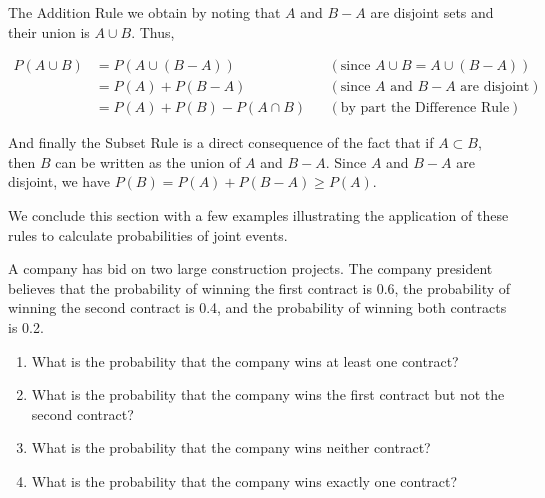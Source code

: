 The Addition Rule we obtain by noting that $A$ and $B-A$ are disjoint sets and their union is $A \cup B$. Thus,

\begin{align*}
    P(A \cup B) &= P(A \cup (B - A)) && (\text{since } A \cup B = A \cup (B - A)) \\
                &= P(A) + P(B - A) && (\text{since } A \text{ and } B - A \text{ are disjoint}) \\
                &= P(A) + P(B) - P(A \cap B) && (\text{by part the Difference Rule})
    \end{align*}
    
And finally the Subset Rule is a direct consequence of the fact that if $A \subset B$, then $B$ can be written as the union of $A$ and $B-A$. Since $A$ and $B-A$ are disjoint, we have $P(B)=P(A)+P(B-A) \geq P(A)$.

We conclude this section with a few examples illustrating the application of these rules to calculate probabilities of joint events.

\begin{example}
    A company has bid on two large construction projects. The company president believes that the probability of winning the first contract is 0.6, the probability of winning the second contract is 0.4, and the probability of winning both contracts is 0.2.

    \begin{enumerate}[label=(\alph*)]
        \item What is the probability that the company wins at least one contract?
        \item What is the probability that the company wins the first contract but not the second contract?
        \item What is the probability that the company wins neither contract?
        \item What is the probability that the company wins exactly one contract?
    \end{enumerate}
\end{example}

